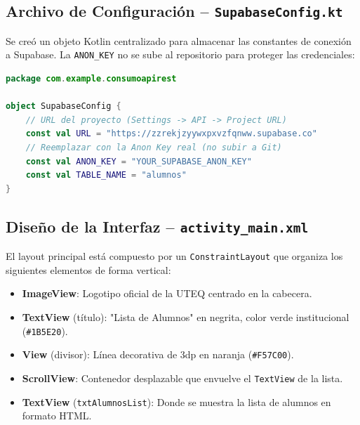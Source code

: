 \documentclass[12pt]{article}
\begin{document}
\subsection{Archivo de Configuración -- \texttt{SupabaseConfig.kt}}

Se creó un objeto Kotlin centralizado para almacenar las constantes de conexión a Supabase. La \texttt{ANON\_KEY} no se sube al repositorio para proteger las credenciales:

\begin{lstlisting}[language=Kotlin, caption={SupabaseConfig.kt}]
package com.example.consumoapirest

object SupabaseConfig {
    // URL del proyecto (Settings -> API -> Project URL)
    const val URL = "https://zzrekjzyywxpxvzfqnww.supabase.co"
    // Reemplazar con la Anon Key real (no subir a Git)
    const val ANON_KEY = "YOUR_SUPABASE_ANON_KEY"
    const val TABLE_NAME = "alumnos"
}
\end{lstlisting}

\subsection{Diseño de la Interfaz -- \texttt{activity\_main.xml}}

El layout principal está compuesto por un \texttt{ConstraintLayout} que organiza los siguientes elementos de forma vertical:

\begin{itemize}[leftmargin=1.5cm]
    \item \textbf{ImageView}: Logotipo oficial de la UTEQ centrado en la cabecera.
    \item \textbf{TextView} (título): "Lista de Alumnos" en negrita, color verde institucional (\texttt{\#1B5E20}).
    \item \textbf{View} (divisor): Línea decorativa de 3dp en naranja (\texttt{\#F57C00}).
    \item \textbf{ScrollView}: Contenedor desplazable que envuelve el \texttt{TextView} de la lista.
    \item \textbf{TextView} (\texttt{txtAlumnosList}): Donde se muestra la lista de alumnos en formato HTML.
\end{itemize}
\end{document}
